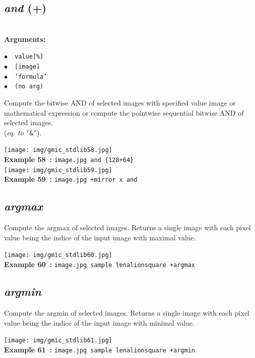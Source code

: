 \documentclass[a4paper,10.5pt,twoside]{book}
\def\comma{\discretionary{,}{}{,}}
\newcommand{\Cb}[1]{\textcolor{cb}{#1}}
\begin{document}
\subsection{\emph{and} (+)}\vspace*{-0.7em}
~\\\textbf{\Cb{Arguments: }}\begin{flushleft}
{\small \Cb{\hspace*{0.5cm}$\bullet$~~\texttt{value[\%]}}}~~~\\
{\small \Cb{\hspace*{0.5cm}$\bullet$~~\texttt{[image]}}}~~~\\
{\small \Cb{\hspace*{0.5cm}$\bullet$~~\texttt{'formula'}}}~~~\\
{\small \Cb{\hspace*{0.5cm}$\bullet$~~\texttt{(no arg)}}}\end{flushleft}
Compute the bitwise AND of selected images with specified value{\comma} image or mathematical
expression{\comma} or compute the pointwise sequential bitwise AND of selected images.
~\\(\emph{eq. to} {\small \texttt{'\&'}}).
\begin{center}\texttt{[image: img/gmic\_stdlib58.jpg]}\\
{\footnotesize \textbf{Example 58~:} \texttt{image.jpg and \{128+64\}}}
\\\texttt{[image: img/gmic\_stdlib59.jpg]}\\
{\footnotesize \textbf{Example 59~:} \texttt{image.jpg +mirror x and}}
\end{center}

\subsection{\emph{argmax} }\vspace*{-0.7em}
Compute the argmax of selected images. Returns a single image
with each pixel value being the indice of the input image with maximal value.
\begin{center}\texttt{[image: img/gmic\_stdlib60.jpg]}\\
{\footnotesize \textbf{Example 60~:} \texttt{image.jpg sample lena{\comma}lion{\comma}square +argmax}}
\end{center}

\subsection{\emph{argmin} }\vspace*{-0.7em}
Compute the argmin of selected images. Returns a single image
with each pixel value being the indice of the input image with minimal value.
\begin{center}\texttt{[image: img/gmic\_stdlib61.jpg]}\\
{\footnotesize \textbf{Example 61~:} \texttt{image.jpg sample lena{\comma}lion{\comma}square +argmin}}
\end{center}
\end{document}
